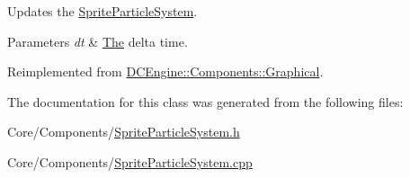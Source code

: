 Updates the \hyperlink{classDCEngine_1_1Components_1_1SpriteParticleSystem}{Sprite\-Particle\-System}. 


\begin{DoxyParams}{Parameters}
{\em dt} & \hyperlink{classThe}{The} delta time. \\
\hline
\end{DoxyParams}


Reimplemented from \hyperlink{classDCEngine_1_1Components_1_1Graphical}{D\-C\-Engine\-::\-Components\-::\-Graphical}.



The documentation for this class was generated from the following files\-:\begin{DoxyCompactItemize}
\item 
Core/\-Components/\hyperlink{SpriteParticleSystem_8h}{Sprite\-Particle\-System.\-h}\item 
Core/\-Components/\hyperlink{SpriteParticleSystem_8cpp}{Sprite\-Particle\-System.\-cpp}\end{DoxyCompactItemize}
